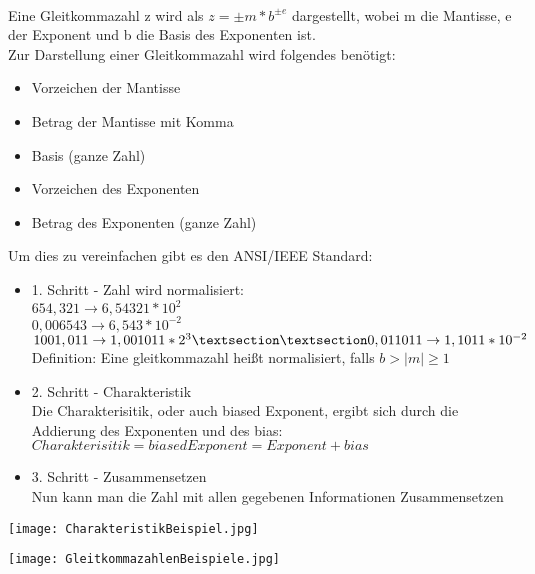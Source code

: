 			\paragraph{} Eine Gleitkommazahl z wird als $z = \pm m * b^{\pm e}$ dargestellt, wobei m die Mantisse,
			e der Exponent und b die Basis des Exponenten ist. \\
			Zur Darstellung einer Gleitkommazahl wird folgendes benötigt: 
			\begin{itemize}
				\item Vorzeichen der Mantisse
				\item Betrag der Mantisse mit Komma
				\item Basis (ganze Zahl)
				\item Vorzeichen des Exponenten
				\item Betrag des Exponenten (ganze Zahl)
			\end{itemize}
			Um dies zu vereinfachen gibt es den ANSI/IEEE Standard:
			\begin{itemize}
				\item 1. Schritt - Zahl wird normalisiert: \\
					$654,321 \rightarrow 6,54321 * 10^2$ \\
					$0,006543 \rightarrow 6,543 * 10^{-2}$ \\
					$1001,011 \rightarrow 1,001011 * 2^3§ \\
					§0,011011 \rightarrow 1,1011 * 10^{-2}$ \\
					Definition: Eine gleitkommazahl heißt normalisiert, falls $b > |m| \geq 1$
				\item 2. Schritt - Charakteristik \\
					Die Charakterisitik, oder auch biased Exponent, ergibt sich durch die Addierung
					des Exponenten und des bias: $Charakterisitik = biased Exponent = Exponent + bias$
				\item 3. Schritt - Zusammensetzen \\
					Nun kann man die Zahl mit allen gegebenen Informationen Zusammensetzen
			\end{itemize}
			\begin{minipage}{0.5\textwidth}
				\begin{center}
					\texttt{[image: CharakteristikBeispiel.jpg]}
				\end{center}
			\end{minipage}
			\begin{minipage}{0.45\textwidth}
				\begin{center}
					\texttt{[image: GleitkommazahlenBeispiele.jpg]}
				\end{center}
			\end{minipage}



